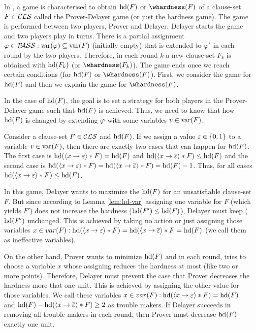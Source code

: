 \documentclass{report}
\begin{document}
In \cite{h18}, a game is characterised to obtain $\operatorname{hd}(F)$ or $\whardness(F)$ of a clause-set $F \in \mathcal{CLS}$ called the Prover-Delayer game (or just the hardness game). The game is performed between two players, Prover and Delayer. Delayer starts the game and two players play in turns. There is a partial assignment $\varphi \in \mathcal{P\hspace{-0.32em}ASS}: \operatorname{var}(\varphi) \subseteq \operatorname{var}(F)$ (initially empty) that is extended to $\varphi'$ in each round by the two players. Therefore, in each round $k$ a new clause-set $F_k$ is obtained with $\operatorname{hd}(F_k)$ (or $\whardness(F_k)$). The game ends once we reach certain conditions (for $\operatorname{hd}(F)$ or $\whardness(F)$). First, we consider the game for $\operatorname{hd}(F)$ and then we explain the game for $\whardness(F)$.

In the case of $\operatorname{hd}(F)$, the goal is to set a strategy for both players in the Prover-Delayer game such that $\operatorname{hd}(F)$ is achieved. Thus, we need to know that how $\operatorname{hd}(F)$ is changed by extending $\varphi$ with some variables $v \in \operatorname{var}(F)$. 

\begin{lem}\label{lem:hd-var}
\cite{h18} Consider a clause-set $F \in \mathcal{CLS}$ and $\operatorname{hd}(F)$. If we assign a value $\varepsilon \in \{ 0,1 \}$ to a variable $v \in \operatorname{var}(F)$, then there are exactly two cases that can happen for $\operatorname{hd}(F)$. The first case is $\operatorname{hd}(\langle x \rightarrow \varepsilon \rangle*F)=\operatorname{hd}(F)$ and $\operatorname{hd}(\langle x \rightarrow \overline {\varepsilon} \rangle*F) \leq \operatorname{hd}(F)$ and the second case is  $\operatorname{hd}(\langle x \rightarrow \varepsilon \rangle*F)=\operatorname{hd}(\langle x \rightarrow \overline {\varepsilon} \rangle*F)=\operatorname{hd}(F)-1$. Thus, for all cases  $\operatorname{hd}(\langle x \rightarrow \varepsilon \rangle*F) \leq \operatorname{hd}(F)$.
\end{lem}

In this game, Delayer wants to maximize the $\operatorname{hd}(F)$ for an unsatisfiable clause-set $F$. But since according to Lemma \ref{lem:hd-var} assigning one variable for $F$ (which yields $F'$) does not increase the hardness ($\operatorname{hd}(F') \leq \operatorname{hd}(F)$), Delayer must keep ($\operatorname{hd}(F')$ unchanged. This is achieved by taking no action or just assigning those variables $x \in var(F): \operatorname{hd}(\langle x \rightarrow \varepsilon \rangle*F)=\operatorname{hd}(\langle x \rightarrow \overline {\varepsilon} \rangle*F = \operatorname{hd}(F)$ (we call them as ineffective variables). 

On the other hand, Prover wants to minimize  $\operatorname{hd}(F)$ and in each round, tries to choose a variable $x$ whose assigning reduces the hardness at most (like two or more points). Therefore, Delayer must prevent the case that Prover decreases the hardness more that one unit. This is achieved by assigning the other value for those variables. We call these variables $x \in var(F): \operatorname{hd}(\langle x \rightarrow \varepsilon \rangle*F)=\operatorname{hd}(F)$ and $\operatorname{hd}(F)- \operatorname{hd}(\langle x \rightarrow \overline {\varepsilon} \rangle*F) \geq 2$ as trouble makers. If Delayer succeeds in removing all trouble makers in each round, then Prover must decrease $\operatorname{hd}(F)$ exactly one unit.
  
\end{document}
